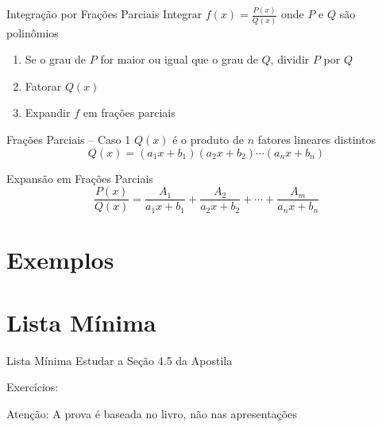 \documentclass[fleqn,utf8,aspectratio=169,12pt]{beamer}
\begin{document}
\begin{frame}{Integração por Frações Parciais}
  Integrar \(f(x)=\frac{P(x)}{Q(x)}\) onde $P$ e $Q$ são polinômios
  \pause
  \begin{enumerate}[<+->]
    \setlength\itemsep{1em}
    \item Se o grau de $P$ for maior ou igual que o grau de $Q$, dividir $P$ por $Q$

    \item Fatorar $Q(x)$

    \item Expandir $f$ em frações parciais
  \end{enumerate}
\end{frame}

\begin{frame}{Frações Parciais -- Caso 1}
  $Q(x)$ é o produto de $n$ fatores lineares distintos
  \[
    Q(x) =
    \left( a_1 x + b_1 \right)
    \left( a_2 x + b_2 \right) \cdots
    \left( a_n x + b_n \right)
  \]

  \pause
  Expansão em Frações Parciais
  \[
    \frac{P(x)}{Q(x)}
    = \frac{A_1}{ a_1 x + b_1 }
    + \frac{A_2}{ a_2 x + b_2 }
    + \cdots
    + \frac{A_m}{ a_n x + b_n }
  \]
\end{frame}

\section{Exemplos}






\section{Lista Mínima}

\begin{frame}{Lista Mínima}
  Estudar a Seção 4.5 da Apostila

  Exercícios:

  \vfill
  Atenção: A prova é baseada no livro, não nas apresentações
\end{frame}

\end{document}
